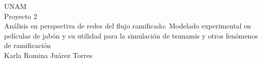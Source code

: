 \documentclass[12pt,letterpaper]{book}
\begin{document}
\begin{titlepage}
    \centering
    \vspace*{2cm}
    {\Large \MakeUppercase{UNAM}} \\
    \vspace{2cm}
    {\Large Proyecto 2}\\
    \vspace{1cm}
    {\Large Análisis en perspectiva de redes del flujo ramificado: Modelado experimental en películas de jabón y su utilidad para la simulación de tsunamis y otros fenómenos de ramificación}\\
    \vspace{2cm}
    {\large Karla Romina Juárez Torres}\\
    \vfill
\end{titlepage}

\tableofcontents
\newpage







\renewcommand{\bibname}{Referencias}


%
\end{document}
